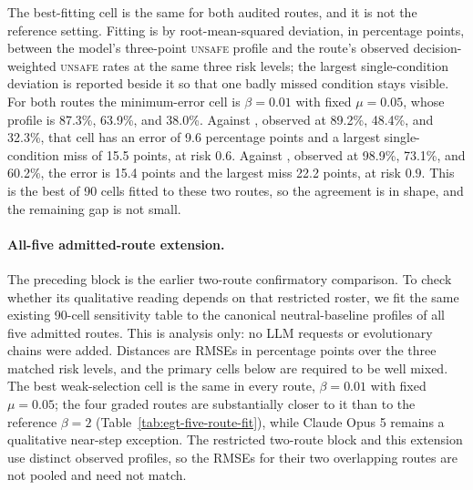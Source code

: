 \documentclass{article}
\newcommand{\Unsafe}{\textsc{unsafe}}
\begin{document}
The best-fitting cell is the same for both audited routes, and it is not the
reference setting. Fitting is by root-mean-squared deviation, in percentage
points, between the model's three-point \Unsafe{} profile and the route's
observed decision-weighted \Unsafe{} rates at the same three risk levels; the
largest single-condition deviation is reported beside it so that one badly
missed condition stays visible. For both routes the minimum-error cell is
    $\beta = 0.01$ with fixed $\mu = 0.05$, whose profile is 87.3\%, 63.9\%, and
    38.0\%. Against , observed at 89.2\%,
    48.4\%, and 32.3\%, that cell has an error of 9.6 percentage points and a
largest single-condition miss of 15.5 points, at risk $0.6$. Against
    , observed at 98.9\%, 73.1\%, and 60.2\%,
the error is 15.4 points and the largest miss 22.2 points, at risk $0.9$.
This is the best of 90 cells fitted to these two routes, so the agreement is in
shape, and the remaining gap is not small.

\paragraph{All-five admitted-route extension.} The preceding block is the
earlier two-route confirmatory comparison. To check whether its qualitative
reading depends on that restricted roster, we fit the same existing 90-cell
sensitivity table to the canonical neutral-baseline profiles of all five
admitted routes. This is analysis only: no LLM requests or evolutionary chains
were added. Distances are RMSEs in percentage points over the three matched
risk levels, and the primary cells below are required to be well mixed. The
best weak-selection cell is the same in every route, $\beta=0.01$ with fixed
$\mu=0.05$; the four graded routes are substantially closer to it than to the
reference $\beta=2$ (Table~\ref{tab:egt-five-route-fit}), while Claude Opus 5
remains a qualitative near-step exception.
The restricted two-route block and this extension use distinct observed
profiles, so the RMSEs for their two overlapping routes are not pooled and need
not match.
\end{document}
